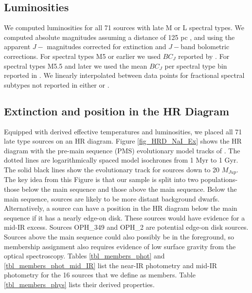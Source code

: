 \subsection{Luminosities}
We computed luminosities for all 71 sources with late M or L spectral types.  We computed absolute magnitudes assuming a distance of 125 pc \citep{2008ApJ...675L..29L}, and using the apparent $J-$ magnitudes corrected for extinction and $J-$band bolometric corrections.  For spectral types M5 or earlier we used $BC_J$ reported by \citep{2013ApJS..208....9P}.  For spectral types M5.5 and later we used the mean $BC_J$ per spectral type bin reported in \citet{2002AJ....124.1170D}.  We linearly interpolated between data points for fractional spectral subtypes not reported in either \citet{2002AJ....124.1170D} or \citet{2013ApJS..208....9P}.


\subsection{Extinction and position in the HR Diagram}
\label{sec_HRD}
Equipped with derived effective temperatures and luminosities, we placed all 71 late type sources on an HR diagram.  Figure \ref{fig_HRD_NaI_Ex} shows the HR diagram with the pre-main sequence (PMS) evolutionary model tracks of \citep{1998A&A...337..403B,2002A&A...382..563B}.  The dotted lines are logarithmically spaced model isochrones from 1 Myr to 1 Gyr.  The solid black lines show the evolutionary track for sources down to 20 $M_{Jup}$.  The key idea from this Figure is that our sample is split into two populations- those below the main sequence and those above the main sequence.  Below the main sequence, sources are likely to be more distant background dwarfs.  Alternatively, a source can have a position in the HR diagram below the main sequence if it has a nearly edge-on disk.  These sources would have evidence for a mid-IR excess.  Sources OPH\_349 and OPH\_2 are potential edge-on disk sources.  Sources above the main sequence could also possibly be in the foreground, so membership assignment also requires evidence of low surface gravity from the optical spectroscopy.  Tables \ref{tbl_members_phot} and \ref{tbl_members_phot_mid_IR} list the near-IR photometry and mid-IR photometry for the 16 sources that we define as members.  Table \ref{tbl_members_phys} lists their derived properties.

\begin{landscape}
	
\end{landscape}

